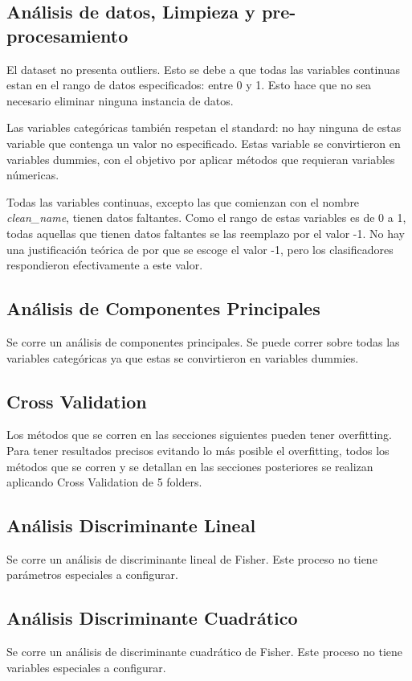 \documentclass[journal]{IEEEtran}
\begin{document}
\subsection{Análisis de datos, Limpieza y pre-procesamiento}
El dataset no presenta outliers. Esto se debe a que todas las variables continuas estan
en el rango de datos especificados: entre 0 y 1. 
Esto hace que no sea necesario eliminar ninguna
instancia de datos.

Las variables categóricas también respetan el standard: no hay ninguna
de estas variable que contenga un valor no especificado. Estas 
variable se convirtieron en variables dummies, con el objetivo 
por aplicar métodos que requieran variables númericas.

Todas las variables continuas, excepto las que comienzan con el
nombre \textit{clean\_name}, tienen datos faltantes. Como el rango
de estas variables es de 0 a 1, todas aquellas que tienen datos
faltantes se las reemplazo por el valor -1. No hay una justificación
teórica de por que se escoge el valor -1, pero los clasificadores
respondieron efectivamente a este valor.

\subsection{Análisis de Componentes Principales}
Se corre un análisis de componentes principales. Se puede correr sobre
todas las variables categóricas ya que estas se convirtieron en 
variables dummies.

\subsection{Cross Validation}
Los métodos que se corren en las secciones siguientes pueden tener overfitting. Para
tener resultados precisos evitando lo más posible el overfitting, todos los
métodos que se corren y se detallan en las secciones posteriores se realizan
aplicando Cross Validation de 5 folders.

\subsection{Análisis Discriminante Lineal}
Se corre un análisis de discriminante lineal de Fisher. Este proceso no 
tiene parámetros especiales a configurar.

\subsection{Análisis Discriminante Cuadrático}
Se corre un análisis de discriminante cuadrático de Fisher. Este proceso
no tiene variables especiales a configurar.
\end{document}
